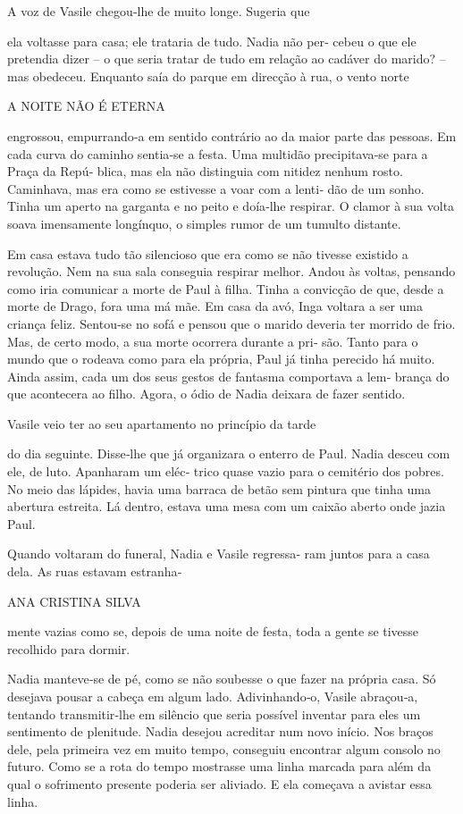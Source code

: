A voz de Vasile chegou‑lhe de muito longe. Sugeria que

ela voltasse para casa; ele trataria de tudo. Nadia não per‑ cebeu o que
ele pretendia dizer -- o que seria tratar de tudo em relação ao cadáver
do marido? -- mas obedeceu. Enquanto saía do parque em direcção à rua, o
vento norte

A NOITE NÃO É ETERNA

engrossou, empurrando‑a em sentido contrário ao da maior parte das
pessoas. Em cada curva do caminho sentia‑se a festa. Uma multidão
precipitava‑se para a Praça da Repú‑ blica, mas ela não distinguia com
nitidez nenhum rosto. Caminhava, mas era como se estivesse a voar com a
lenti‑ dão de um sonho. Tinha um aperto na garganta e no peito e
doía‑lhe respirar. O clamor à sua volta soava imensamente longínquo, o
simples rumor de um tumulto distante.

Em casa estava tudo tão silencioso que era como se não tivesse existido
a revolução. Nem na sua sala conseguia respirar melhor. Andou às voltas,
pensando como iria comunicar a morte de Paul à filha. Tinha a convicção
de que, desde a morte de Drago, fora uma má mãe. Em casa da avó, Inga
voltara a ser uma criança feliz. Sentou‑se no sofá e pensou que o marido
deveria ter morrido de frio. Mas, de certo modo, a sua morte ocorrera
durante a pri‑ são. Tanto para o mundo que o rodeava como para ela
própria, Paul já tinha perecido há muito. Ainda assim, cada um dos seus
gestos de fantasma comportava a lem‑ brança do que acontecera ao filho.
Agora, o ódio de Nadia deixara de fazer sentido.

Vasile veio ter ao seu apartamento no princípio da tarde

do dia seguinte. Disse‑lhe que já organizara o enterro de Paul. Nadia
desceu com ele, de luto. Apanharam um eléc‑ trico quase vazio para o
cemitério dos pobres. No meio das lápides, havia uma barraca de betão
sem pintura que tinha uma abertura estreita. Lá dentro, estava uma mesa
com um caixão aberto onde jazia Paul.

Quando voltaram do funeral, Nadia e Vasile regressa‑ ram juntos para a
casa dela. As ruas estavam estranha‑

ANA CRISTINA SILVA

mente vazias como se, depois de uma noite de festa, toda a gente se
tivesse recolhido para dormir.

Nadia manteve‑se de pé, como se não soubesse o que fazer na própria
casa. Só desejava pousar a cabeça em algum lado. Adivinhando‑o, Vasile
abraçou‑a, tentando transmitir‑lhe em silêncio que seria possível
inventar para eles um sentimento de plenitude. Nadia desejou acreditar
num novo início. Nos braços dele, pela primeira vez em muito tempo,
conseguiu encontrar algum consolo no futuro. Como se a rota do tempo
mostrasse uma linha marcada para além da qual o sofrimento presente
poderia ser aliviado. E ela começava a avistar essa linha.
